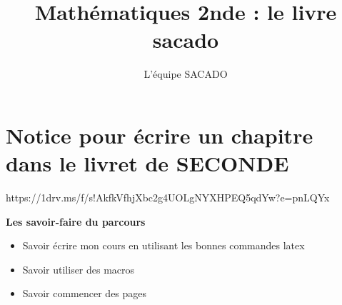 



\title{Mathématiques 2nde  : le livre sacado}
\author{L'équipe SACADO}




\chapter{Notice pour écrire un chapitre dans le livret de SECONDE}
{https://1drv.ms/f/s!AkfkVfhjXbc2g4UOLgNYXHPEQ5qdYw?e=pnLQYx}
{
 \begin{CpsCol}
	\textbf{Les savoir-faire du parcours}
 	\begin{itemize}
 		\item Savoir écrire mon cours en utilisant les bonnes commandes latex
 		\item Savoir utiliser des macros
 		\item Savoir commencer des pages
 	\end{itemize}
 \end{CpsCol}
}
%
%
